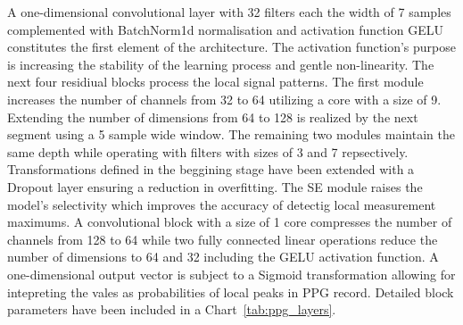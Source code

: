 \documentclass[journal]{IEEEtran}
\begin{document}
{A one-dimensional convolutional layer with 32 filters each the width of 7 samples complemented with BatchNorm1d normalisation and activation function GELU constitutes the first element of the architecture. The activation function's purpose is increasing the stability of the learning process and gentle non-linearity. The next four residiual blocks process the local signal patterns. The first module increases the number of channels from 32 to 64 utilizing a core with a size of 9. Extending the number of dimensions from 64 to 128 is realized by the next segment using a 5 sample wide window. The remaining two modules maintain the same depth while operating with filters with sizes of 3 and 7 repsectively. Transformations defined in the beggining stage have been extended with a Dropout layer ensuring a reduction in overfitting.
\newpage
The SE module raises the model's selectivity which improves the accuracy of detectig local measurement maximums. A convolutional block with a size of 1 core compresses the number of channels from 128 to 64 while two fully connected linear operations reduce the number of dimensions to 64 and 32 including the GELU activation function. A one-dimensional output vector is subject to a Sigmoid transformation allowing for intepreting the vales as probabilities of local peaks in PPG record. Detailed block parameters have been included in a Chart~\ref{tab:ppg_layers}.

}
\end{document}
